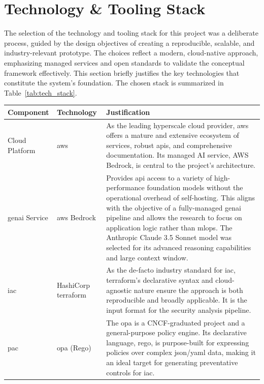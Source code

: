\section{Technology \& Tooling Stack}
\label{sec:tech_stack}

The selection of the technology and tooling stack for this project was a deliberate process, guided by the design objectives of creating a reproducible, scalable, and industry-relevant prototype. The choices reflect a modern, \gls{cloud-native} approach, emphasizing managed services and open standards to validate the conceptual framework effectively. This section briefly justifies the key technologies that constitute the system's foundation. The chosen stack is summarized in Table~\ref{tab:tech_stack}.

\begin{center}
\begin{tabular}{|l|l|p{7cm}|}
\hline
\textbf{Component} & \textbf{Technology} & \textbf{Justification} \\
\hline
Cloud Platform & \gls{aws} & As the leading hyperscale cloud provider, \gls{aws} offers a mature and extensive ecosystem of services, robust \gls{api}s, and comprehensive documentation. Its managed AI service, AWS Bedrock, is central to the project's architecture. \\
\hline
\gls{genai} Service & \gls{aws} Bedrock \cite{noauthor_claude_nodate} & Provides \gls{api} access to a variety of high-performance foundation models without the operational overhead of self-hosting. This aligns with the objective of a fully-managed \gls{genai} pipeline and allows the research to focus on application logic rather than \gls{mlops}. The Anthropic Claude 3.5 Sonnet model was selected for its advanced reasoning capabilities and large context window. \\
\hline
\gls{iac} & HashiCorp \gls{terraform} \cite{noauthor_terraform_nodate} & As the de-facto industry standard for \gls{iac}, \gls{terraform}'s declarative syntax and cloud-agnostic nature ensure the approach is both reproducible and broadly applicable. It is the input format for the security analysis pipeline. \\
\hline
\gls{pac} & \gls{opa} (Rego) \cite{noauthor_introduction_nodate} & The \gls{opa} is a CNCF-graduated project and a general-purpose policy engine. Its declarative language, \gls{rego}, is purpose-built for expressing policies over complex \gls{json}/\gls{yaml} data, making it an ideal target for generating preventative controls for \gls{iac}. \\

\end{tabular}
\end{center}
